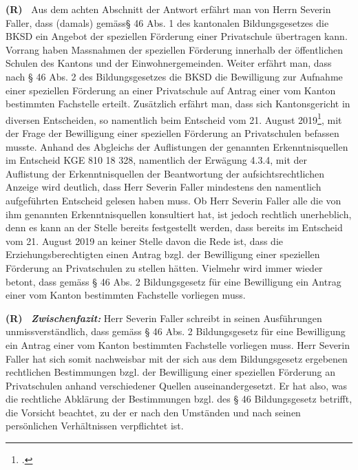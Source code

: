 \documentclass[paper=a4,fontsize=12pt, oneside, numbers=noenddot]{scrbook}
\newcounter{rz}
\newcommand{\RzLabel}[1]{
	\refstepcounter{rz}\label{#1}\textbf{(R\arabic{rz})~}
}
\begin{document}
\RzLabel{AntragSPD4AVS} Aus dem achten Abschnitt der Antwort erfährt man von Herrn Severin Faller, dass (damals) gemäss§ 46 Abs. 1 des kantonalen Bildungsgesetzes die BKSD ein Angebot der speziellen Förderung einer Privatschule übertragen kann. Vorrang haben Massnahmen der speziellen Förderung innerhalb der öffentlichen Schulen des Kantons und der Einwohnergemeinden. Weiter erfährt man, dass nach § 46 Abs. 2 des Bildungsgesetzes die BKSD die Bewilligung zur Aufnahme einer speziellen Förderung an einer Privatschule auf Antrag einer vom Kanton bestimmten Fachstelle erteilt. Zusätzlich erfährt man, dass sich Kantonsgericht in diversen Entscheiden, so namentlich beim Entscheid vom 21. August 2019\footcite[Erw. 4.3.4]{KGE81018328}, mit der Frage der Bewilligung einer speziellen Förderung an Privatschulen befassen musste. Anhand des Abgleichs der Auflistungen der genannten Erkenntnisquellen im Entscheid KGE 810 18 328, namentlich der Erwägung 4.3.4, mit der Auflistung der Erkenntnisquellen der Beantwortung der aufsichtsrechtlichen Anzeige wird deutlich, dass Herr Severin Faller mindestens den namentlich aufgeführten Entscheid gelesen haben muss. Ob Herr Severin Faller alle die von ihm genannten Erkenntnisquellen konsultiert hat, ist jedoch rechtlich unerheblich, denn es kann an der Stelle bereits festgestellt werden, dass bereits im Entscheid vom 21. August 2019 an keiner Stelle davon die Rede ist, dass die Erziehungsberechtigten einen Antrag bzgl. der Bewilligung einer speziellen Förderung an Privatschulen zu stellen hätten. Vielmehr wird immer wieder betont, dass gemäss § 46 Abs. 2 Bildungsgesetz für eine Bewilligung ein Antrag einer vom Kanton bestimmten Fachstelle vorliegen muss. 

\RzLabel{ZwischenfazitSF1} \textit{\textbf{Zwischenfazit:}} Herr Severin Faller schreibt in seinen Ausführungen unmissverständlich, dass gemäss § 46 Abs. 2 Bildungsgesetz für eine Bewilligung ein Antrag einer vom Kanton bestimmten Fachstelle vorliegen muss. Herr Severin Faller hat sich somit nachweisbar mit der sich aus dem Bildungsgesetz ergebenen rechtlichen Bestimmungen bzgl. der Bewilligung einer speziellen Förderung an Privatschulen anhand verschiedener Quellen auseinandergesetzt.  Er hat also, was die rechtliche Abklärung der Bestimmungen bzgl. des § 46 Bildungsgesetz betrifft, die Vorsicht beachtet, zu der er nach den Umständen und nach seinen persönlichen Verhältnissen verpflichtet ist. 
\end{document}
